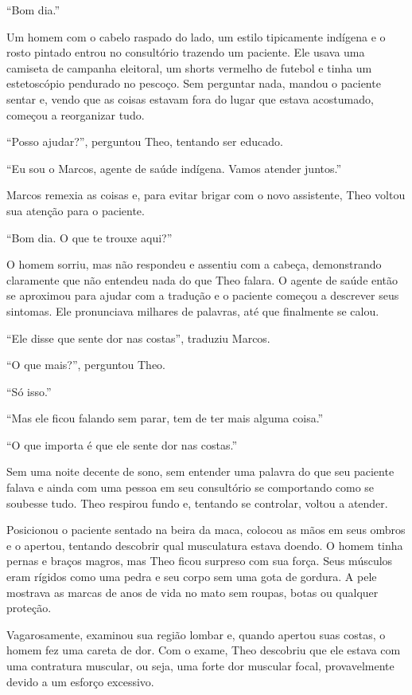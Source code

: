 ``Bom dia.''

Um homem com o cabelo raspado do lado, um estilo tipicamente indígena
e o rosto pintado entrou no consultório trazendo um paciente. Ele
usava uma camiseta de campanha eleitoral, um shorts vermelho de futebol
e tinha um estetoscópio pendurado no pescoço. Sem perguntar nada, mandou
o paciente sentar e, vendo que as coisas estavam fora do lugar que
estava acostumado, começou a reorganizar tudo.

``Posso ajudar?'', perguntou Theo, tentando ser educado.

``Eu sou o Marcos, agente de saúde indígena. Vamos atender juntos.''

Marcos remexia as coisas e, para evitar brigar com o novo assistente,
Theo voltou sua atenção para o paciente.

``Bom dia. O que te trouxe aqui?''

O homem sorriu, mas não respondeu e assentiu com a cabeça, demonstrando
claramente que não entendeu nada do que Theo falara. O agente de saúde
então se aproximou para ajudar com a tradução e o paciente começou a
descrever seus sintomas. Ele pronunciava milhares de palavras, até que
finalmente se calou.

``Ele disse que sente dor nas costas'', traduziu Marcos.

``O que mais?'', perguntou Theo.

``Só isso.''

``Mas ele ficou falando sem parar, tem de ter mais alguma coisa.''

``O que importa é que ele sente dor nas costas.''

Sem uma noite decente de sono, sem entender uma palavra do que seu
paciente falava e ainda com uma pessoa em seu consultório se comportando
como se soubesse tudo. Theo respirou fundo e, tentando se controlar,
voltou a atender.

Posicionou o paciente sentado na beira da maca, colocou as mãos em seus
ombros e o apertou, tentando descobrir qual musculatura estava doendo. O
homem tinha pernas e braços magros, mas Theo ficou surpreso com sua
força. Seus músculos eram rígidos como uma pedra e seu corpo sem uma
gota de gordura. A pele mostrava as marcas de anos de vida no mato sem
roupas, botas ou qualquer proteção.

Vagarosamente, examinou sua região lombar e, quando apertou suas costas,
o homem fez uma careta de dor. Com o exame, Theo descobriu que ele
estava com uma contratura muscular, ou seja, uma forte dor muscular
focal, provavelmente devido a um esforço excessivo.

